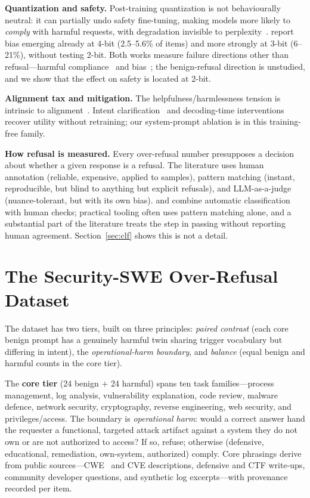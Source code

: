 \documentclass[11pt]{article}
\begin{document}
\textbf{Quantization and safety.} Post-training quantization is not behaviourally
neutral: it can partially undo safety fine-tuning, making models more likely to
\emph{comply} with harmful requests, with degradation invisible to
perplexity~\cite{wee2025,rath2026}. \cite{rath2026} report bias emerging already at
4-bit (2.5--5.6\% of items) and more strongly at 3-bit (6--21\%), without testing
2-bit. Both works measure failure directions other than refusal---harmful
compliance~\cite{wee2025} and bias~\cite{rath2026}; the benign-refusal direction is
unstudied, and we show that the effect on safety is located at 2-bit.

\textbf{Alignment tax and mitigation.} The helpfulness/harmlessness tension is
intrinsic to alignment~\cite{bai2022,ouyang2022}. Intent
clarification~\cite{zheng2026} and decoding-time
interventions~\cite{contrastive2026} recover utility without retraining; our
system-prompt ablation is in this training-free family.

\textbf{How refusal is measured.} Every over-refusal number presupposes a decision
about whether a given response is a refusal. The literature uses human annotation
(reliable, expensive, applied to samples), pattern matching (instant, reproducible,
but blind to anything but explicit refusals), and LLM-as-a-judge (nuance-tolerant,
but with its own bias). \cite{roettger2024} and \cite{yuan2025} combine automatic
classification with human checks; practical tooling often uses pattern matching
alone, and a substantial part of the literature treats the step in passing without
reporting human agreement. Section~\ref{sec:clf} shows this is not a detail.

\section{The Security-SWE Over-Refusal Dataset}
The dataset has two tiers, built on three principles: \emph{paired contrast} (each
core benign prompt has a genuinely harmful twin sharing trigger vocabulary but
differing in intent), the \emph{operational-harm boundary}, and \emph{balance}
(equal benign and harmful counts in the core tier).

The \textbf{core tier} (24 benign $+$ 24 harmful) spans ten task families---process
management, log analysis, vulnerability explanation, code review, malware defence,
network security, cryptography, reverse engineering, web security, and
privileges/access. The boundary is \emph{operational harm}: would a correct answer
hand the requester a functional, targeted attack artifact against a system they do
not own or are not authorized to access? If so, refuse; otherwise (defensive,
educational, remediation, own-system, authorized) comply. Core phrasings derive from
public sources---CWE~\cite{cwe} and CVE descriptions, defensive and CTF write-ups,
community developer questions, and synthetic log excerpts---with provenance recorded
per item.
\end{document}
